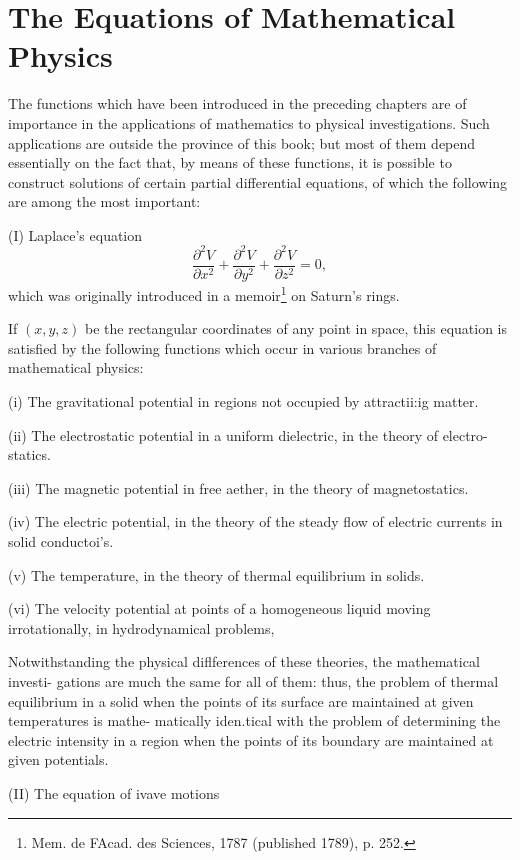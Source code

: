 %
%
\chapter{The Equations of Mathematical Physics}
The functions which have been introduced in the preceding chapters
are of importance in the applications of mathematics to physical
investigations. Such applications are outside the province of this
book; but most of them depend essentially on the fact that, by means
of these functions, it is possible to construct solutions of certain
partial differential equations, of which the following are among the
most important:

(I) Laplace's equation
$$
\frac{\partial^{2} V}{\partial x^{2}} +
\frac{\partial^{2} V}{\partial y^{2}} +
\frac{\partial^{2} V}{\partial z^{2}} =
0,
$$
which was originally introduced in a memoir\footnote{%
  Mem. de FAcad. des Sciences, 1787 (published 1789), p. 252.}
on Saturn's rings.

If $(x, y, z)$ be the rectangular coordinates of any point in
space, this equation is satisfied by the following functions
which occur in various branches of mathematical physics:

(i) The gravitational potential in regions not occupied by
attractii:ig matter.

(ii) The electrostatic potential in a uniform dielectric, in the
theory of electro- statics.

(iii) The magnetic potential in free aether, in the theory of
magnetostatics.

(iv) The electric potential, in the theory of the steady flow of
electric currents in solid conductoi's.

(v) The temperature, in the theory of thermal equilibrium in solids.

(vi) The velocity potential at points of a homogeneous liquid moving
irrotationally, in hydrodynamical problems,

Notwithstanding the physical diflferences of these theories, the
mathematical investi- gations are much the same for all of them:
thus, the problem of thermal equilibrium in a solid when the points of
its surface are maintained at given temperatures is mathe- matically
iden.tical with the problem of determining the electric intensity in a
region when the points of its boundary are maintained at given
potentials.

(II) The equation of ivave motions

